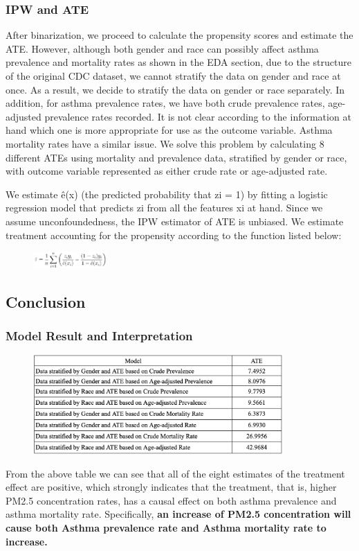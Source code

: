 \documentclass{article}
\begin{document}
\subsubsection{IPW and ATE}
After binarization, we proceed to calculate the propensity scores and estimate the ATE. However, although both gender and race can possibly affect asthma prevalence and mortality rates as shown in the EDA section, due to the structure of the original CDC dataset, we cannot stratify the data on gender and race at once. As a result, we decide to stratify the data on gender or race separately. In addition, for asthma prevalence rates, we have both crude prevalence rates, age-adjusted prevalence rates recorded. It is not clear according to the information at hand which one is more appropriate for use as the outcome variable. Asthma mortality rates have a similar issue. We solve this problem by calculating 8 different ATEs using mortality and prevalence data, stratified by gender or race, with outcome variable represented as either crude rate or age-adjusted rate.

We estimate \^{e(x)} (the predicted probability that zi = 1) by fitting a logistic regression model that predicts zi from all the features xi at hand. Since we assume unconfoundedness, the IPW estimator of ATE is unbiased. We estimate treatment accounting for the propensity according to the function listed below:

\begin{figure}[h]\centering\includegraphics[width=0.25\textwidth]{formula.jpg}\end{figure}

\subsection{Conclusion}

\subsubsection{Model Result and Interpretation}
 \begin{figure}[h]\centering\includegraphics[width=0.85\textwidth]{Q1 Result Table.jpg} \end{figure}
 From the above table we can see that all of the eight estimates of the treatment effect are positive, which strongly indicates that the treatment, that is, higher PM2.5 concentration rates, has a causal effect on both asthma prevalence and asthma mortality rate. Specifically, \textbf{an increase of PM2.5 concentration will cause both Asthma prevalence rate and Asthma mortality rate to increase.}
 
\end{document}
